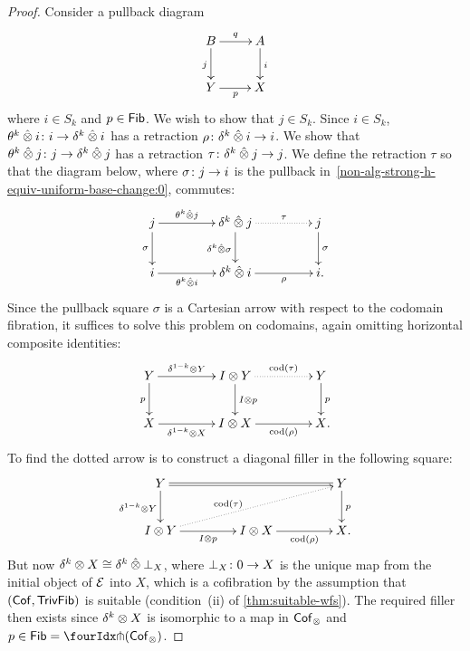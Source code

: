 \documentclass[reqno,10pt,a4paper,oneside,draft]{amsart}
\begin{document}
{{\begin{proof} Consider a pullback diagram
\begin{equation}
\label{non-alg-strong-h-equiv-uniform-base-change:0}
\begin{gathered}
\xymatrix{
 B \ar[d]_j \ar[r]^q & A \ar[d]^i \\ 
Y \ar[r]_p & X }
\end{gathered}
\end{equation}
where $i  \in S_k$ and $p \in \mathsf{Fib}$. We wish to show that $j \in  S_k$. Since $i \in S_k$, $\theta^k \mathbin{\hat{\otimes}} i \colon i \to \delta^k \mathbin{\hat{\otimes}} i$ has a retraction $\rho \colon \delta^k \mathbin{\hat{\otimes}} i \to i$.  We show that $\theta^k \mathbin{\hat{\otimes}} j \colon j \to \delta^k \mathbin{\hat{\otimes}} j$ has a retraction 
$\tau \colon  \delta^k \mathbin{\hat{\otimes}} j \to j$. We define the retraction $\tau$ so that the diagram below, where $\sigma \colon j \to i$ is 
the pullback in~\eqref{non-alg-strong-h-equiv-uniform-base-change:0}, commutes:
\[
\xymatrix@C+2em{
j 
  \ar[r]^-{\thetak \hatotimes j}
  \ar[d]_{\sigma}
&
  \kcyl \hatotimes j 
  \ar@{.>}[r]^-{\tau}
  \ar[d]_{\kcyl \hatotimes \sigma}
&
 j 
  \ar[d]^{\sigma}
\\
  i
  \ar[r]_-{\thetak \hatotimes i}
&
  \kcyl \hatotimes i
  \ar[r]_-{\rho}
&
  i
\rlap{.}}
\]
Since the pullback square $\sigma$ is a Cartesian arrow with respect to the codomain fibration, it suffices to solve this problem on codomains, again omitting horizontal composite identities:
\[
\xymatrix@C+2em{
  Y
  \ar[r]^-{\kcylinv \otimes Y}
  \ar[d]_{p}
&
  \interval \otimes Y
  \ar@{.>}[r]^-{\cod(\tau)}
  \ar[d]^{\interval \otimes p}
&
  Y
  \ar[d]^{p}
\\
  X
  \ar[r]_-{\kcylinv \otimes X}
&
  \interval \otimes X
  \ar[r]_-{\cod(\rho)}
&
  X
\rlap{.}}
\]
To find the dotted arrow is to construct a diagonal filler in the following square:
\[
\xymatrix@C+2em{
  Y
  \ar@{=}[rr]
  \ar[d]_{\kcylinv \otimes Y}
&&
  Y
  \ar[d]^{p}
\\
  \interval \otimes Y
  \ar[r]_-{I \otimes p}
  \ar@{.>}[urr]^(0.4){\cod(\tau)}
&
  \interval \otimes X
  \ar[r]_-{\cod(\rho)}
&
  X
\rlap{.}}
\]
But now $\delta^k \otimes X \cong 
\delta^k \mathbin{\hat{\otimes}} \bot_X$, where $\bot_X \colon 0 \to X$ is the unique map from the initial object of $\mathcal{E}$ into $X$, which is 
a cofibration by the assumption that $(\mathsf{Cof}, \mathsf{TrivFib})$ is suitable (condition~(ii) of \cref{thm:suitable-wfs}). The required
filler then exists since $\delta^k \otimes X$
is isomorphic to a map in $\mathsf{Cof}_\otimes$ and~$p \in \Fib = \liftr{(\Cof_\otimes)}$.
\end{proof} 


}}
\end{document}
